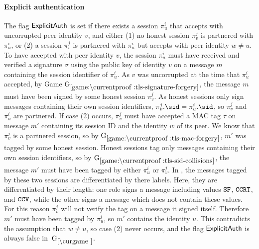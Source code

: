 \begin{collectinmacro}{\TLSProofFull}{}{}
\paragraph{Explicit authentication}
The flag $\mathsf{ExplicitAuth}$ is set if there exists a session $\pi_u^i$ that accepts with uncorrupted peer identity $v$, and either (1) no honest session $\pi_v^j$ is partnered with $\pi_u^i$, or (2) a session $\pi_v^j$ is partnered with $\pi_u^i$ but accepts with peer identity $w \neq u$. 
To have accepted with peer identity $v$, the session $\pi_u^i$ must have received and verified a signature $\sigma$ using the public key of identity $v$ on a message $m$ containing the session identifier of $\pi_u^i$. As $v$ was uncorrupted at the time that $\pi_u^i$ accepted, by Game $\lblGm{tls-signature-forgery}$, the message $m$ must have been signed by some honest session $\pi_v^j$. As honest sessions only sign messages containing their own session identifiers, $\pi_v^j.\sid = \pi_u^i.\sid$, so $\pi_v^j$ and $\pi_u^i$ are partnered.
If case (2) occurs, $\pi_v^j$ must have accepted a MAC tag $\tau$ on message $m'$ containing its session ID and the identity $w$ of its peer. We know that $\pi_v^j$ is a partnered session, so by $\lblGm{tls-mac-forgery}$, $m'$ was tagged by some honest session. Honest sessions tag only messages containing their own session identifiers, so by $\lblGm{tls-sid-collisions}$, the message $m'$ must have been tagged by either $\pi_u^i$ or $\pi_v^j$. In \SIGMAI, the messages tagged by these two sessions are differentiated by there labels. Here, they are differentiated by their length: one role signs a message including values $\mathtt{SF}$, $\mathtt{CCRT}$, and $\mathtt{CCV}$, while the other signs a message which does not contain these values. For this reason $\pi_v^j$ will not verify the tag on a message it signed itself. Therefore $m'$ must have been tagged by $\pi_u^i$, so $m'$ contains the identity $u$. This contradicts the assumption that $w \neq u$, so case (2) never occurs, and the flag $\mathsf{ExplicitAuth}$ is always false in~$\curGm$.


\end{collectinmacro}
